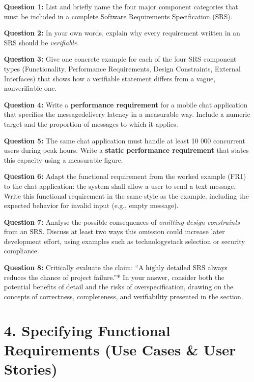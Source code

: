 \documentclass[12pt, a4paper]{article}
\begin{document}
\noindent\textbf{Question 1:}  
List and briefly name the four major component categories that must be included in a complete Software Requirements Specification (SRS). \newpage

\noindent\textbf{Question 2:}  
In your own words, explain why every requirement written in an SRS should be \emph{verifiable}. \newpage

\noindent\textbf{Question 3:}  
Give one concrete example for each of the four SRS component types (Functionality, Performance Requirements, Design Constraints, External Interfaces) that shows how a verifiable statement differs from a vague, nonverifiable one. \newpage

\noindent\textbf{Question 4:}  
Write a \textbf{performance requirement} for a mobile chat application that specifies the messagedelivery latency in a measurable way. Include a numeric target and the proportion of messages to which it applies. \newpage

\noindent\textbf{Question 5:}  
The same chat application must handle at least 10 000 concurrent users during peak hours. Write a \textbf{static performance requirement} that states this capacity using a measurable figure. \newpage

\noindent\textbf{Question 6:}  
Adapt the functional requirement from the worked example (FR1) to the chat application: the system shall allow a user to send a text message. Write this functional requirement in the same style as the example, including the expected behavior for invalid input (e.g., empty message). \newpage

\noindent\textbf{Question 7:}  
Analyse the possible consequences of \emph{omitting design constraints} from an SRS. Discuss at least two ways this omission could increase later development effort, using examples such as technologystack selection or security compliance. \newpage

\noindent\textbf{Question 8:}  
Critically evaluate the claim: ``A highly detailed SRS always reduces the chance of project failure.''* In your answer, consider both the potential benefits of detail and the risks of overspecification, drawing on the concepts of correctness, completeness, and verifiability presented in the section. \newpage

\newpage

\section{4. Specifying Functional Requirements (Use Cases \& User Stories)}
\end{document}
